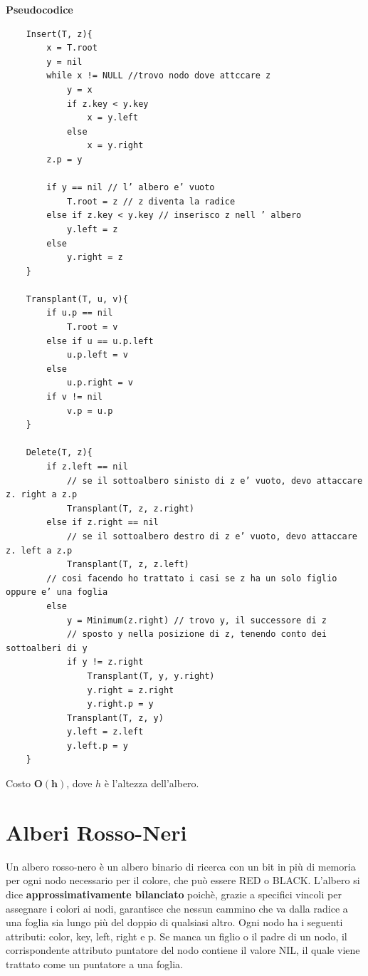 \noindent \textbf{Pseudocodice}
\begin{verbatim}
    Insert(T, z){
        x = T.root
        y = nil
        while x != NULL //trovo nodo dove attccare z
            y = x
            if z.key < y.key
                x = y.left
            else
                x = y.right
        z.p = y
        
        if y == nil // l’ albero e’ vuoto
            T.root = z // z diventa la radice
        else if z.key < y.key // inserisco z nell ’ albero
            y.left = z
        else
            y.right = z
    }

    Transplant(T, u, v){
        if u.p == nil
            T.root = v
        else if u == u.p.left
            u.p.left = v
        else
            u.p.right = v
        if v != nil
            v.p = u.p
    }

    Delete(T, z){
        if z.left == nil
            // se il sottoalbero sinisto di z e’ vuoto, devo attaccare z. right a z.p
            Transplant(T, z, z.right)
        else if z.right == nil
            // se il sottoalbero destro di z e’ vuoto, devo attaccare z. left a z.p
            Transplant(T, z, z.left)
        // cosi facendo ho trattato i casi se z ha un solo figlio oppure e’ una foglia
        else
            y = Minimum(z.right) // trovo y, il successore di z
            // sposto y nella posizione di z, tenendo conto dei sottoalberi di y
            if y != z.right
                Transplant(T, y, y.right)
                y.right = z.right
                y.right.p = y  
            Transplant(T, z, y)
            y.left = z.left
            y.left.p = y
    }
\end{verbatim}
\noindent Costo $\mathbf{O(h)}$, dove $h$ è l'altezza dell'albero.
\section{Alberi Rosso-Neri}
Un albero rosso-nero è un albero binario di ricerca con un bit in più di memoria per ogni nodo
necessario per il colore, che può essere RED o BLACK. L’albero si dice \textbf{approssimativamente
bilanciato} poichè, grazie a specifici vincoli per assegnare i colori ai nodi, garantisce che nessun
cammino che va dalla radice a una foglia sia lungo più del doppio di qualsiasi altro.
Ogni nodo ha i seguenti attributi: color, key, left, right e p. Se manca un figlio o il padre di
un nodo, il corrispondente attributo puntatore del nodo contiene il valore NIL, il quale viene
trattato come un puntatore a una foglia.
